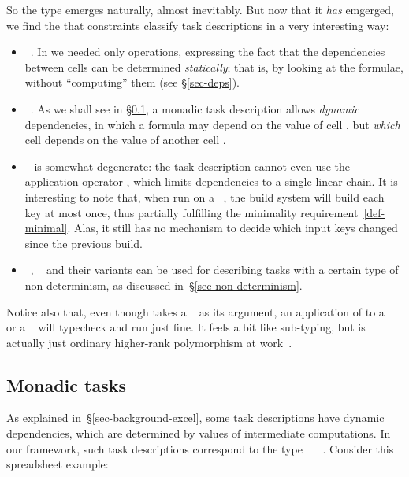 So the type  emerges naturally, almost inevitably.  But now that
it \emph{has} emgerged, we find the that constraints  classify task descriptions
in a very interesting way:
\begin{itemize}
\item {}~. In  we needed only 
  operations, expressing the fact that the dependencies between cells can be
  determined \emph{statically}; that is, by looking at the formulae, without
  ``computing'' them (see \S\ref{sec-deps}).
\item {}~. As we shall see in \S\ref{sec-task-monad}, a monadic task
  description allows \emph{dynamic} dependencies, in which a formula may depend
  on the value of cell , but \emph{which} cell  depends on the
  value of another cell .
\item {}~ is somewhat degenerate: the task description cannot
  even use the application operator \hs{<*>}, which limits dependencies to a
  single linear chain. It is interesting to note that, when run on a
  ~, the  build system will build each key at most
  once, thus partially fulfilling the minimality requirement~\ref{def-minimal}.
  Alas, it still has no mechanism to decide which input keys changed since the
  previous build.
\item {}~, ~ and their
  variants can be used for describing tasks with a certain type of
  non-determinism, as discussed in~\S\ref{sec-non-determinism}.
\end{itemize}

Notice also that, even though  takes a ~ as its
argument, an application of  to a ~ or
a ~ will typecheck and run just fine. It feels a bit like
sub-typing, but is actually just ordinary higher-rank polymorphism at
work~\cite{jones2007practical}.

\subsection{Monadic tasks}\label{sec-task-monad}

As explained in~\S\ref{sec-background-excel}, some task descriptions have dynamic
dependencies, which are determined by values of intermediate computations. In
our framework, such task descriptions correspond to the type
~~~. Consider this spreadsheet example:

